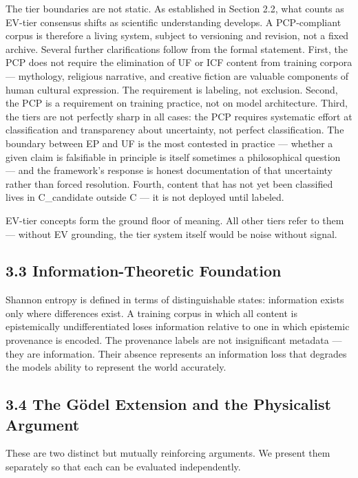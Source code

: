 \documentclass[
]{article}
\begin{document}
The tier boundaries are not static. As established in Section 2.2, what
counts as EV-tier consensus shifts as scientific understanding develops.
A PCP-compliant corpus is therefore a living system, subject to
versioning and revision, not a fixed archive. Several further
clarifications follow from the formal statement. First, the PCP does not
require the elimination of UF or ICF content from training corpora ---
mythology, religious narrative, and creative fiction are valuable
components of human cultural expression. The requirement is labeling,
not exclusion. Second, the PCP is a requirement on training practice,
not on model architecture. Third, the tiers are not perfectly sharp in
all cases: the PCP requires systematic effort at classification and
transparency about uncertainty, not perfect classification. The boundary
between EP and UF is the most contested in practice --- whether a given
claim is falsifiable in principle is itself sometimes a philosophical
question --- and the framework's response is honest documentation of
that uncertainty rather than forced resolution. Fourth, content that has
not yet been classified lives in C\_candidate outside C --- it is not
deployed until labeled.

EV-tier concepts form the ground floor of meaning. All other tiers refer
to them --- without EV grounding, the tier system itself would be noise
without signal.

\subsection{3.3 Information-Theoretic
Foundation}\label{information-theoretic-foundation}

Shannon entropy is defined in terms of distinguishable states:
information exists only where differences exist. A training corpus in
which all content is epistemically undifferentiated loses information
relative to one in which epistemic provenance is encoded. The provenance
labels are not insignificant metadata --- they are information. Their
absence represents an information loss that degrades the
model\textquotesingle s ability to represent the world accurately.

\subsection{3.4 The Gödel Extension and the Physicalist
Argument}\label{the-guxf6del-extension-and-the-physicalist-argument}

These are two distinct but mutually reinforcing arguments. We present
them separately so that each can be evaluated independently.
\end{document}
